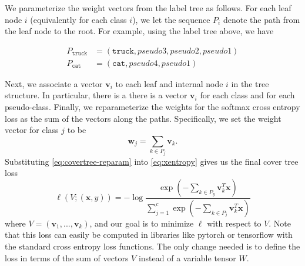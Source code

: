 \documentclass[twoside]{article}
\theoremstyle{definition}
\newcommand{\trans}[1]{{#1}^{T}}
\newcommand{\vv}{\mathbf v}
\newcommand{\w}{\mathbf w}
\newcommand{\x}{\mathbf x}
\begin{document}
\begin{center}
\end{center}

We parameterize the weight vectors from the label tree as follows.
For each leaf node $i$ (equivalently for each class $i$),
we let the sequence $P_i$ denote the path from the leaf node to the root.
For example, using the label tree above,
we have

\begin{equation}
\begin{split}
    P_{\texttt{truck}} &= (\texttt{truck}, \textit{pseudo3}, \textit{pseudo2}, \textit{pseudo1} ) \\
    P_{\texttt{cat}} &= (\texttt{cat}, \textit{pseudo4}, \textit{pseudo1} )
\end{split}
\end{equation}


Next, we associate a vector $\vv_i$ to each leaf and internal node $i$ in the tree structure.
In particular, there is a there is a vector $\vv_i$ for each class and for each pseudo-class.
Finally, we reparameterize the weights for the softmax cross entropy loss as the sum of the vectors along the paths.
Specifically, we set the weight vector for class $j$ to be 
\begin{equation}
    \label{eq:covertree-reparam}
    \w_j = \sum_{k\in P_j} \vv_k
    .
\end{equation}
Substituting \eqref{eq:covertree-reparam} into \eqref{eq:xentropy} gives us the final cover tree loss
\begin{equation}
    \ell(V;(\x,y)) = - \log \frac {\exp(-\sum_{k\in P_y}\trans\vv_k \x)}{\sum_{j=1}^c \exp(- \sum_{k\in P_j}\trans\vv_k \x)}
\end{equation}
where $V=(\vv_1,...,\vv_k)$,
and our goal is to minimize $\ell$ with respect to $V$.
Note that this loss can easily be computed in libraries like pytorch or tensorflow with the standard cross entropy loss functions.
The only change needed is to define the loss in terms of the sum of vectors $V$ instead of a variable tensor $W$.
\end{document}
